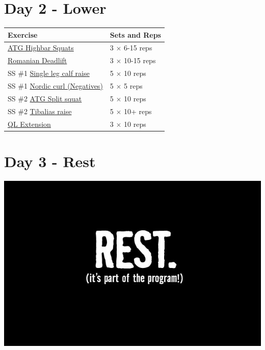 \documentclass[11pt]{article}
\begin{document}
\section*{Day 2 - Lower}
\begin{center}
\begin{tabular}{|l|l|}
\hline
\textbf{Exercise} & \textbf{Sets and Reps}\\
\hline
\href{https://www.youtube.com/watch?v=zoZWgTrZLd8}{ATG Highbar Squats} & 3 $\times$ 6-15 reps \\
\hline
\href {https://www.youtube.com/watch?v=FUwsp0OVyVM}{Romanian Deadlift} & 3 $\times$  10-15 reps \\
\hline
SS \#1 \href{https://www.youtube.com/watch?v=DlcI-MK6jAA}{Single leg calf raise} & 5 $\times$ 10 reps \\
SS \#1 \href{https://www.youtube.com/shorts/ybiNmYVkOe0}{Nordic curl (Negatives)} & 5 $\times$ 5 reps\\
\hline
SS \#2 \href{https://www.youtube.com/shorts/8i8aIERu0mA}{ATG Split squat} & 5 $\times$ 10 reps \\
SS \#2 \href{https://www.youtube.com/shorts/q-Gf5wm-zeU}{Tibalias raise} & 5 $\times$ 10+ reps \\
\hline
\href{https://www.youtube.com/shorts/MVu18rxmukk}{QL Extension} & 3 $\times$ 10 reps \\
\hline
\end{tabular}
\end{center}

\section*{Day 3 - Rest}
\includegraphics[width=\textwidth]{rest.jpg}
\end{document}
